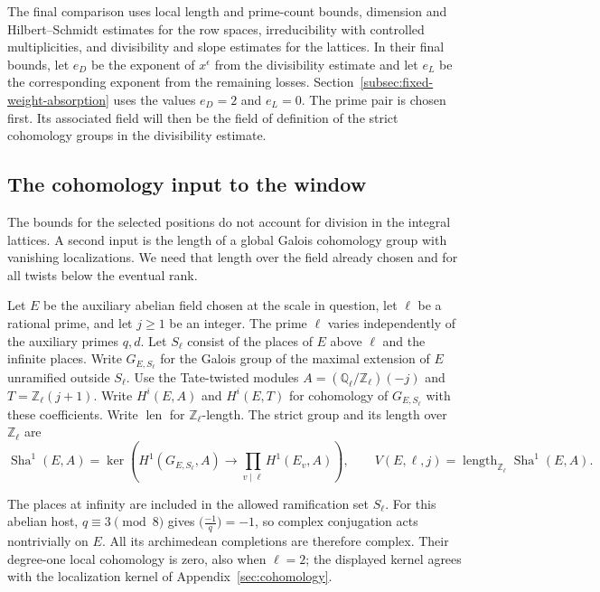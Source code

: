 The final comparison uses local length and prime-count
bounds, dimension and Hilbert--Schmidt estimates for the
row spaces, irreducibility with controlled multiplicities,
and divisibility and slope estimates for the lattices.
In their final bounds, let \(e_D\) be the exponent of
\(x^\epsilon\) from the divisibility estimate and let \(e_L\)
be the corresponding exponent from the remaining losses.
Section~\ref{subsec:fixed-weight-absorption} uses the values
\(e_D=2\) and \(e_L=0\). The prime pair is chosen first. Its associated field will then be the field of definition of the strict cohomology groups in the divisibility estimate.







\subsection{The cohomology input to the window}

The bounds for the selected positions do not account for division in the integral lattices. A second input is the length of a global Galois cohomology group with vanishing localizations. We need that length over the field already chosen and for all twists below the eventual rank.

\begin{definition}\label{def:strict-length}
Let \(E\) be the auxiliary abelian field chosen at the scale in
question, let \(\ell\) be a rational prime, and let \(j\ge1\)
be an integer. The prime \(\ell\) varies independently of the
auxiliary primes \(q,d\). Let \(S_\ell\) consist of the places
of \(E\) above \(\ell\) and the infinite places. Write
\(G_{E,S_\ell}\) for the Galois group of the maximal extension
of \(E\) unramified outside \(S_\ell\).
Use the Tate-twisted modules
\(A=(\mathbb Q_\ell/\mathbb Z_\ell)(-j)\) and
\(T=\mathbb Z_\ell(j+1)\). Write \(H^i(E,A)\) and \(H^i(E,T)\)
for cohomology of \(G_{E,S_\ell}\) with these coefficients.
Write \(\operatorname{len}\) for \(\mathbb Z_\ell\)-length. The strict group and its length over \(\mathbb Z_\ell\) are
\[
 \operatorname{Sha}^1(E,A)=
 \ker\!\left(H^1(G_{E,S_\ell},A)\longrightarrow
        \prod_{v\mid\ell}H^1(E_v,A)\right),\qquad
 V(E,\ell,j)=\operatorname{length}_{\mathbb Z_\ell}\operatorname{Sha}^1(E,A).
\]
\end{definition}
The places at infinity are included in the allowed ramification set \(S_\ell\).
For this abelian host, \(q\equiv3\pmod8\) gives
\(\bigl(\frac{-1}{q}\bigr)=-1\), so complex conjugation acts nontrivially on \(E\). All its archimedean completions are therefore complex. Their degree-one local cohomology is zero, also when \(\ell=2\); the displayed kernel agrees with the localization kernel of Appendix~\ref{sec:cohomology}.

